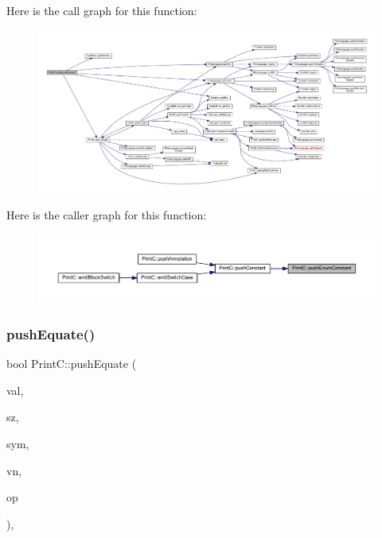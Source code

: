 Here is the call graph for this function\+:
\nopagebreak
\begin{figure}[H]
\begin{center}
\leavevmode
\includegraphics[width=350pt]{class_print_c_a70078a4551cf53bafcb44360afd2f027_cgraph}
\end{center}
\end{figure}
Here is the caller graph for this function\+:
\nopagebreak
\begin{figure}[H]
\begin{center}
\leavevmode
\includegraphics[width=350pt]{class_print_c_a70078a4551cf53bafcb44360afd2f027_icgraph}
\end{center}
\end{figure}
\mbox{\label{class_print_c_ae236127c4e6ea51836f881210aa59ec5}} 
\subsubsection{\texorpdfstring{pushEquate()}{pushEquate()}}
{\footnotesize\ttfamily bool Print\+C\+::push\+Equate (\begin{DoxyParamCaption}\item[{\mbox{\hyperlink{types_8h_a2db313c5d32a12b01d26ac9b3bca178f}{uintb}}}]{val,  }\item[{int4}]{sz,  }\item[{const \mbox{\hyperlink{class_equate_symbol}{Equate\+Symbol}} $\ast$}]{sym,  }\item[{const \mbox{\hyperlink{class_varnode}{Varnode}} $\ast$}]{vn,  }\item[{const \mbox{\hyperlink{class_pcode_op}{Pcode\+Op}} $\ast$}]{op }\end{DoxyParamCaption})\hspace{0.3cm}{\ttfamily [protected]}, {\ttfamily [virtual]}}



